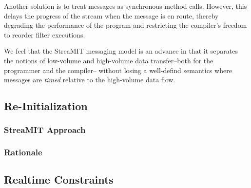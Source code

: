 Another solution is to treat messages as synchronous method calls.
However, this delays the progress of the stream when the message is en
route, thereby degrading the performance of the program and
restricting the compiler's freedom to reorder filter executions.  

We feel that the StreaMIT messaging model is an advance in that it
separates the notions of low-volume and high-volume data
transfer--both for the programmer and the compiler-- without losing a
well-defind semantics where messages are {\it timed} relative to the
high-volume data flow.

\subsection{Re-Initialization}

\subsubsection{StreaMIT Approach}
\subsubsection{Rationale}

\subsection{Realtime Constraints}

